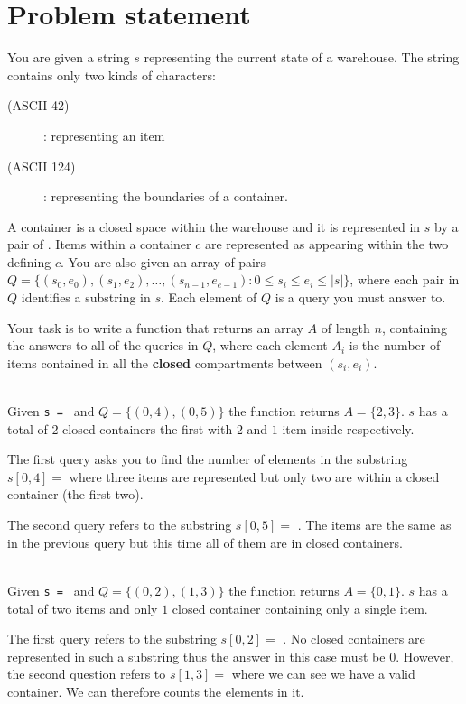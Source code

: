 \section{Problem statement}
\begin{exercise}
	You are given a string $s$ representing the current state of a warehouse. The string contains
	only two kinds of characters: 
	\begin{description}
		\item[\bsq{\textbf{\texttt{*}}}(ASCII 42)]: representing an item 
		\item[\bsq{\textbf{\texttt{|}}}(ASCII 124)]: representing the boundaries of a container.
	\end{description}
	
	A container is a closed space within the warehouse and it is represented in $s$ by a pair of
	\bsq{\texttt{|}}. Items within a container $c$ are represented as \bsq{\texttt{*}} appearing
	within the two \bsq{\texttt{|}} defining $c$. You are also given an array of pairs $Q = \{(s_0,
	e_0),(s_1, e_2),\ldots,(s_{n-1}, e_{e-1}) : 0 \leq s_i \leq e_i \leq |s|\}$, where each pair in
	$Q$ identifies a substring in $s$. Each element of $Q$ is a query you must answer to.
	
	Your task is to write a function that returns an array $A$ of length $n$, containing the answers
	to all of the queries in $Q$, where each element $A_i$ is the number of items contained in all
	the \textbf{closed} compartments between $(s_i, e_i)$.	

\begin{example}
	\hfill \\
	Given \texttt{s = \bsq{|**|*|*}} and $Q = \{(0,4),(0,5)\}$ the function returns $A=\{2,3\}$. $s$
	has a total of $2$ closed containers the first with $2$ and $1$ item inside respectively.
	
	The first query asks you to find the number of elements in the substring $s[0,4]=$
	\texttt{\bsq{|**|*}} where three items are represented but only two are within a closed
	container (the first two).
	
	The second query refers to the substring $s[0,5]=$ \texttt{\bsq{|**|*|}}. The items are the same
	as in the previous query but this time all of them are in closed containers.
	
\end{example}

\begin{example}
	\hfill \\
	Given \texttt{s = \bsq{*|*|}} and $Q = \{(0,2),(1,3)\}$ the function returns $A=\{0,1\}$. $s$
	has a total of two items and only $1$ closed container containing only a single item.

	The first query refers to the substring $s[0,2]=$ \texttt{\bsq{*|*}}. No closed containers are
	represented in such a substring thus the answer in this case must be $0$. However, the second
	question refers to  $s[1,3]=$ \texttt{\bsq{|*|}} where we can see we have a valid container. We
	can therefore counts the elements in it.
\end{example}

\end{exercise}
